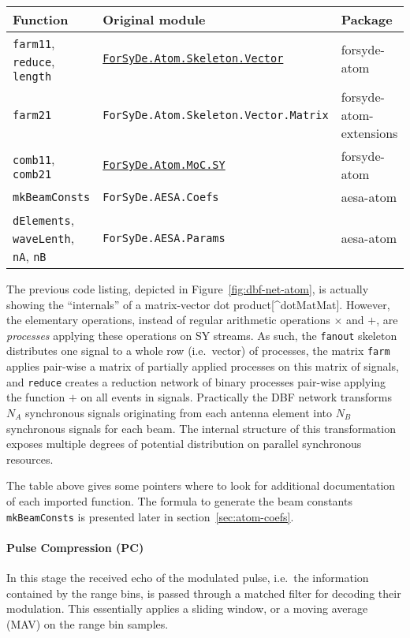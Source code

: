\documentclass[
  a4paper,
]{article}
\let\oldparagraph\paragraph
\renewcommand{\paragraph}[1]{\oldparagraph{#1}\mbox{}}
\begin{document}
\begin{longtable}[]{@{}lll@{}}
\toprule
Function & Original module & Package\tabularnewline
\midrule
\endhead
\texttt{farm11}, \texttt{reduce}, \texttt{length} &
\href{https://forsyde.github.io/forsyde-atom/api/ForSyDe-Atom-Skeleton-Vector.html}{\texttt{ForSyDe.Atom.Skeleton.Vector}}
& forsyde-atom\tabularnewline
\texttt{farm21} & \texttt{ForSyDe.Atom.Skeleton.Vector.Matrix} &
forsyde-atom-extensions\tabularnewline
\texttt{comb11}, \texttt{comb21} &
\href{https://forsyde.github.io/forsyde-atom/api/ForSyDe-Atom-MoC-SY.html}{\texttt{ForSyDe.Atom.MoC.SY}}
& forsyde-atom\tabularnewline
\texttt{mkBeamConsts} & \texttt{ForSyDe.AESA.Coefs} &
aesa-atom\tabularnewline
\texttt{dElements}, \texttt{waveLenth}, \texttt{nA}, \texttt{nB} &
\texttt{ForSyDe.AESA.Params} & aesa-atom\tabularnewline
\bottomrule
\end{longtable}

\suppressfloats

The previous code listing, depicted in Figure~\ref{fig:dbf-net-atom}, is
actually showing the ``internals'' of a matrix-vector dot
product{[}\^{}dotMatMat{]}. However, the elementary operations, instead
of regular arithmetic operations \(\times\) and \(+\), are
\emph{processes} applying these operations on SY streams. As such, the
\texttt{fanout} skeleton distributes one signal to a whole row
(i.e.~vector) of processes, the matrix \texttt{farm} applies pair-wise a
matrix of partially applied processes on this matrix of signals, and
\texttt{reduce} creates a reduction network of binary processes
pair-wise applying the function \(+\) on all events in signals.
Practically the DBF network transforms \(N_A\) synchronous signals
originating from each antenna element into \(N_B\) synchronous signals
for each beam. The internal structure of this transformation exposes
multiple degrees of potential distribution on parallel synchronous
resources.

The table above gives some pointers where to look for additional
documentation of each imported function. The formula to generate the
beam constants \texttt{mkBeamConsts} is presented later in
section~\ref{sec:atom-coefs}.

\hypertarget{sec:pc-atom}{%
\paragraph{Pulse Compression (PC)}\label{sec:pc-atom}}

In this stage the received echo of the modulated pulse, i.e.~the
information contained by the range bins, is passed through a matched
filter for decoding their modulation. This essentially applies a sliding
window, or a moving average (MAV) on the range bin samples.
\end{document}
